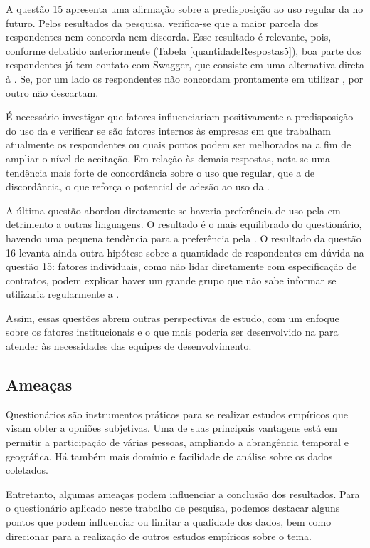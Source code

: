 A questão 15 apresenta uma afirmação sobre a predisposição ao uso regular da
\neoidl{} no futuro. Pelos resultados da pesquisa, verifica-se que a maior
parcela dos respondentes nem concorda nem discorda. Esse resultado é relevante,
pois, conforme debatido anteriormente (Tabela \ref{quantidadeRespostas5}), boa
parte dos respondentes já tem contato com Swagger, que consiste em uma
alternativa direta à \neoidl{}.
Se, por um lado os respondentes não concordam prontamente em utilizar \neoidl{}, por
outro não descartam.

É necessário investigar que fatores influenciariam positivamente a predisposição
do uso da \neoidl{} e verificar se são fatores internos às empresas em que
trabalham atualmente os respondentes ou quais pontos podem ser melhorados na
\neoidl{} a fim de ampliar o nível de aceitação. Em relação às demais respostas,
nota-se uma tendência mais forte de concordância sobre o uso que regular, que
a de discordância, o que reforça o potencial de adesão ao uso da \neoidl{}.

A última questão abordou diretamente se haveria preferência de uso pela
\neoidl{} em detrimento a outras linguagens. O resultado é o mais equilibrado do
questionário, havendo uma pequena tendência para a preferência pela \neoidl{}.
O resultado da questão 16 levanta ainda outra hipótese sobre a quantidade de
respondentes em dúvida na questão 15: fatores individuais, como não lidar
diretamente com especificação de contratos, podem explicar haver um grande grupo
que não sabe informar se utilizaria regularmente a \neoidl{}.

Assim, essas questões abrem outras perspectivas de estudo, com um enfoque sobre
os fatores institucionais e o que mais poderia ser desenvolvido na \neoidl{}
para atender às necessidades das equipes de desenvolvimento.

\subsection{Ameaças}
\label{AmeacaoEstudoSubjetivo}

Questionários são instrumentos práticos para se realizar estudos empíricos que
visam obter a opniões subjetivas. Uma de suas principais vantagens está em
permitir a participação de várias pessoas, ampliando a abrangência temporal e
geográfica. Há também mais domínio e facilidade de análise sobre os dados
coletados.

Entretanto, algumas ameaças podem influenciar a conclusão dos resultados. Para o
questionário aplicado neste trabalho de pesquisa, podemos destacar alguns pontos
que podem influenciar ou limitar a qualidade dos dados, bem como direcionar para
a realização de outros estudos empíricos sobre o tema.


